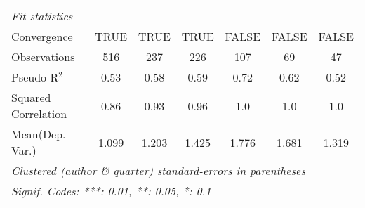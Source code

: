 \begin{tabular}{lcccccc}
   \midrule
   \emph{Fit statistics}\\
   Convergence                                                &TRUE          & TRUE      & TRUE         & FALSE         & FALSE        & FALSE\\  
   Observations                                               & 516          & 237       & 226          & 107           & 69           & 47\\  
   Pseudo R$^2$                                               & 0.53         & 0.58      & 0.59         & 0.72          & 0.62         & 0.52\\  
   Squared Correlation                                        & 0.86         & 0.93      & 0.96         & 1.0           & 1.0          & 1.0\\  
Mean(Dep. Var.) & 1.099 & 1.203 & 1.425 & 1.776 & 1.681 & 1.319 \\
   \midrule \midrule
   \multicolumn{7}{l}{\emph{Clustered (author \& quarter) standard-errors in parentheses}}\\
   \multicolumn{7}{l}{\emph{Signif. Codes: ***: 0.01, **: 0.05, *: 0.1}}\\
\end{tabular}
\par\endgroup
